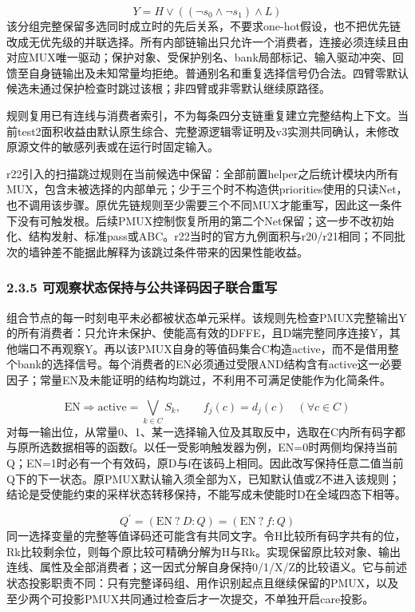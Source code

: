 \documentclass[UTF8,fontset=fandol,12pt]{ctexart}
\begin{document}
\[
Y=H\lor((\neg s_0\land\neg s_1)\land L)
\]
该分组完整保留多选同时成立时的先后关系，不要求one-hot假设，也不把优先链改成无优先级的并联选择。所有内部链输出只允许一个消费者，连接必须连续且由对应MUX唯一驱动；保护对象、受保护别名、bank局部标记、输入驱动冲突、回馈至自身链输出及未知常量均拒绝。普通别名和重复选择信号仍合法。四臂零默认候选未通过保护检查时跳过该根；非四臂或非零默认继续原路径。

规则复用已有连线与消费者索引，不为每条四分支链重复建立完整结构上下文。当前test2面积收益由默认原生综合、完整源逻辑零证明及v3实测共同确认，未修改原源文件的敏感列表或在运行时固定输入。

r22引入的扫描跳过规则在当前候选中保留：全部前置helper之后统计模块内所有MUX，包含未被选择的内部单元；少于三个时不构造供priorities使用的只读Net，也不调用该步骤。原优先链规则至少需要三个不同MUX才能重写，因此这一条件下没有可触发根。后续PMUX控制恢复所用的第二个Net保留；这一步不改初始化、结构发射、标准pass或ABC。r22当时的官方九例面积与r20/\allowbreak{}r21相同；不同批次的墙钟差不能据此解释为该跳过条件带来的因果性能收益。

\Needspace{237.6pt}\subsubsection*{2.3.5  可观察状态保持与公共译码因子联合重写}
组合节点的每一时刻电平未必都被状态单元采样。该规则先检查PMUX完整输出Y的所有消费者：只允许未保护、使能高有效的DFFE，且D端完整同序连接Y，其他端口不再观察Y。再以该PMUX自身的等值码集合C构造active，而不是借用整个bank的选择信号。每个消费者的EN必须通过受限AND结构含有active这一必要因子；常量EN及未能证明的结构均跳过，不利用不可满足使能作为化简条件。

\[
\mathrm{EN}\Rightarrow\mathrm{active}=\bigvee_{k\in C}S_k,\qquad f_j(c)=d_j(c)\quad(\forall c\in C)
\]
对每一输出位，从常量0、1、某一选择输入位及其取反中，选取在C内所有码字都与原所选数据相等的函数f。以任一受影响触发器为例，EN=0时两侧均保持当前Q；EN=1时必有一个有效码，原D与f在该码上相同。因此改写保持任意二值当前Q下的下一状态。原PMUX默认输入须全部为X，已知默认值或Z不进入该规则；结论是受使能约束的采样状态转移保持，不能写成未使能时D在全域四态下相等。

\[
Q^{\prime}=(\mathrm{EN}\ ?\ D:Q)=(\mathrm{EN}\ ?\ f:Q)
\]
同一选择变量的完整等值译码还可能含有共同文字。令H比较所有码字共有的位，Rk比较剩余位，则每个原比较可精确分解为H与Rk。实现保留原比较对象、输出连线、属性及全部消费者；这一因式分解自身保持0/\allowbreak{}1/\allowbreak{}X/\allowbreak{}Z的比较语义。它与前述状态投影职责不同：只有完整译码组、用作识别起点且继续保留的PMUX，以及至少两个可投影PMUX共同通过检查后才一次提交，不单独开启care投影。
\end{document}
